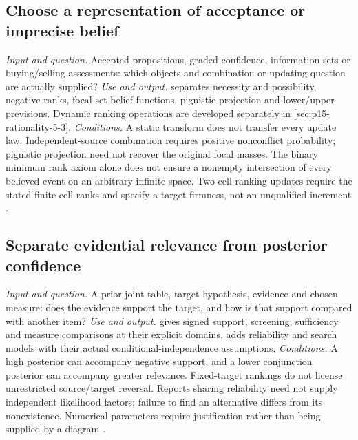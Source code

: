 \subsection{Choose a representation of acceptance or imprecise belief}
\label{sec:p14-finder-belief-representations}
\textit{Input and question.} Accepted propositions, graded confidence,
information sets or buying/selling assessments: which objects and combination
or updating question are actually supplied?
\textit{Use and output.}  separates necessity
and possibility, negative ranks, focal-set belief functions, pignistic
projection and lower/upper previsions. Dynamic ranking operations are
developed separately in \cref{sec:p15-rationality-5-3}.
\textit{Conditions.} A static transform does not transfer every update law.
Independent-source combination requires positive nonconflict probability;
pignistic projection need not recover the original focal masses. The binary
minimum rank axiom alone does not ensure a nonempty intersection of every
believed event on an arbitrary infinite space. Two-cell ranking updates
require the stated finite cell ranks and specify a target firmness, not an
unqualified increment \cite{DuboisPrade2021RepresentingBelief}.

\subsection{Separate evidential relevance from posterior confidence}
\label{sec:p14-finder-evidential-relevance}
\textit{Input and question.} A prior joint table, target hypothesis, evidence
and chosen measure: does the evidence support the target, and how is that
support compared with another item?
\textit{Use and output.}  gives signed support,
screening, sufficiency and measure comparisons at their explicit domains.
 adds reliability and search models with their
actual conditional-independence assumptions.
\textit{Conditions.} A high posterior can accompany negative support, and
a lower conjunction posterior can accompany greater relevance. Fixed-target
rankings do not license unrestricted source/target reversal. Reports sharing
reliability need not supply independent likelihood factors; failure to find
an alternative differs from its nonexistence. Numerical parameters require
justification rather than being supplied by a diagram
\cite{Merin2021Relevance,Hartmann2021BayesNets}.

